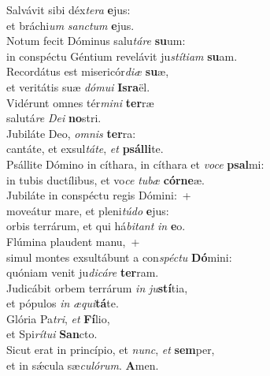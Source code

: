 \evenverse Salvávit sibi déx\textit{te}\textit{ra} \textbf{e}jus:~\*\\
\evenverse et bráchi\textit{um} \textit{san}\textit{ctum} \textbf{e}jus.\\
\oddverse Notum fecit Dóminus salu\textit{tá}\textit{re} \textbf{su}um:~\*\\
\oddverse in conspéctu Géntium revelávit ju\textit{stí}\textit{ti}\textit{am} \textbf{su}am.\\
\evenverse Recordátus est misericór\textit{di}\textit{æ} \textbf{su}æ,~\*\\
\evenverse et veritátis suæ \textit{dó}\textit{mu}\textit{i} \textbf{Is}\textbf{ra}ël.\\
\oddverse Vidérunt omnes tér\textit{mi}\textit{ni} \textbf{ter}ræ~\*\\
\oddverse salutá\textit{re} \textit{De}\textit{i} \textbf{no}stri.\\
\evenverse Jubiláte Deo, \textit{om}\textit{nis} \textbf{ter}ra:~\*\\
\evenverse cantáte, et exsul\textit{tá}\textit{te}, \textit{et} \textbf{psál}\textbf{li}te.\\
\oddverse Psállite Dómino in cíthara, in cíthara et \textit{vo}\textit{ce} \textbf{psal}mi:~\*\\
\oddverse in tubis ductílibus, et vo\textit{ce} \textit{tu}\textit{bæ} \textbf{cór}\textbf{ne}æ.\\
\evenverse Jubiláte in conspéctu regis Dómini:~+\\
\evenverse  moveátur mare, et pleni\textit{tú}\textit{do} \textbf{e}jus:~\*\\
\evenverse orbis terrárum, et qui há\textit{bi}\textit{tant} \textit{in} \textbf{e}o.\\
\oddverse Flúmina plaudent manu,~+\\
\oddverse  simul montes exsultábunt a con\textit{spé}\textit{ctu} \textbf{Dó}mini:~\*\\
\oddverse quóniam venit ju\textit{di}\textit{cá}\textit{re} \textbf{ter}ram.\\
\evenverse Judicábit orbem terrárum \textit{in} \textit{ju}\textbf{stí}tia,~\*\\
\evenverse et pópulos \textit{in} \textit{æ}\textit{qui}\textbf{tá}te.\\
\oddverse Glória Pa\textit{tri}, \textit{et} \textbf{Fí}lio,~\*\\
\oddverse et Spi\textit{rí}\textit{tu}\textit{i} \textbf{San}cto.\\
\evenverse Sicut erat in princípio, et \textit{nunc}, \textit{et} \textbf{sem}per,~\*\\
\evenverse et in sǽcula sæ\textit{cu}\textit{ló}\textit{rum}. \textbf{A}men.\\
